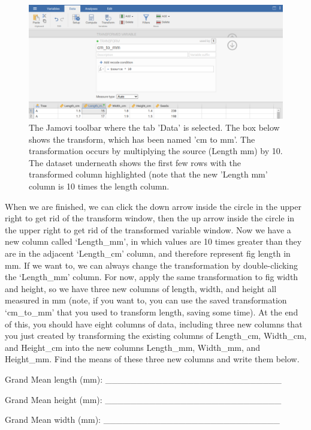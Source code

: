 \documentclass[
]{scrbook}
\begin{document}
\begin{figure}
\includegraphics[width=1\linewidth]{img/jamovi_transform_cm_to_mm} \caption{The Jamovi toolbar where the tab 'Data' is selected. The box below shows the transform, which has been named 'cm to mm'. The transformation occurs by multiplying the source (Length mm) by 10. The dataset underneath shows the first few rows with the transformed column highlighted (note that the new 'Length mm' column is 10 times the length column.}\label{fig:unnamed-chunk-32}
\end{figure}

When we are finished, we can click the down arrow inside the circle in the upper right to get rid of the transform window, then the up arrow inside the circle in the upper right to get rid of the transformed variable window.
Now we have a new column called `Length\_mm', in which values are 10 times greater than they are in the adjacent `Length\_cm' column, and therefore represent fig length in mm.
If we want to, we can always change the transformation by double-clicking the `Length\_mm' column.
For now, apply the same transformation to fig width and height, so we have three new columns of length, width, and height all measured in mm (note, if you want to, you can use the saved transformation `cm\_to\_mm' that you used to transform length, saving some time).
At the end of this, you should have eight columns of data, including three new columns that you just created by transforming the existing columns of Length\_cm, Width\_cm, and Height\_cm into the new columns Length\_mm, Width\_mm, and Height\_mm.
Find the means of these three new columns and write them below.

Grand Mean length (mm): \_\_\_\_\_\_\_\_\_\_\_\_\_\_\_\_\_\_\_\_\_\_\_\_\_\_\_\_

Grand Mean height (mm): \_\_\_\_\_\_\_\_\_\_\_\_\_\_\_\_\_\_\_\_\_\_\_\_\_\_\_\_

Grand Mean width (mm): \_\_\_\_\_\_\_\_\_\_\_\_\_\_\_\_\_\_\_\_\_\_\_\_\_\_\_\_
\end{document}
